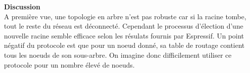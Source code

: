             \hspace{-0.75cm}
            \textbf{Discussion}\\
            A première vue, une topologie en arbre n'est pas robuste car si la racine tombe,
            tout le reste du réseau est déconnecté. Cependant le processus d'élection
            d'une nouvelle racine semble efficace selon les résulats fournis par Espressif.
            Un point négatif du protocole est que pour un noeud donné, sa table de routage contient tous les
            noeuds de son sous-arbre.
            On imagine donc difficilement utiliser ce protocole pour un nombre élevé de noeuds.
